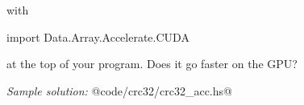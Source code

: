 \documentclass[11pt,a4paper]{article}
\begin{document}
\noindent with

\begin{haskell}
import Data.Array.Accelerate.CUDA
\end{haskell}

\noindent at the top of your program. Does it go faster on the GPU?

\emph{Sample solution:} @code/crc32/crc32_acc.hs@

%
% 
% 
% 
% 
% 
% 
% 
% 
% 
% 
% 
% 
% 
% 
% 
\end{document}
